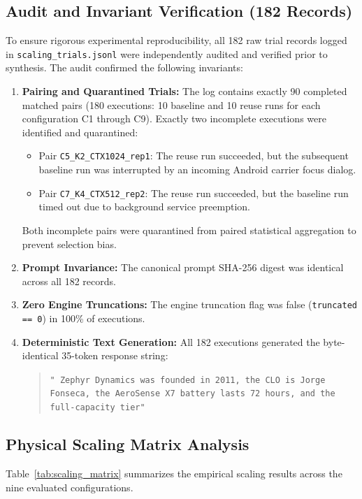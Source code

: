 \subsection{Audit and Invariant Verification (182 Records)}
To ensure rigorous experimental reproducibility, all 182 raw trial records logged in \texttt{scaling\_trials.jsonl} were independently audited and verified prior to synthesis. The audit confirmed the following invariants:
\begin{enumerate}
    \item \textbf{Pairing and Quarantined Trials:} The log contains exactly 90 completed matched pairs (180 executions: 10 baseline and 10 reuse runs for each configuration C1 through C9). Exactly two incomplete executions were identified and quarantined:
    \begin{itemize}
        \item Pair \texttt{C5\_K2\_CTX1024\_rep1}: The reuse run succeeded, but the subsequent baseline run was interrupted by an incoming Android carrier focus dialog.
        \item Pair \texttt{C7\_K4\_CTX512\_rep2}: The reuse run succeeded, but the baseline run timed out due to background service preemption.
    \end{itemize}
    Both incomplete pairs were quarantined from paired statistical aggregation to prevent selection bias.
    \item \textbf{Prompt Invariance:} The canonical prompt SHA-256 digest was identical across all 182 records.
    \item \textbf{Zero Engine Truncations:} The engine truncation flag was false (\texttt{truncated == 0}) in 100\% of executions.
    \item \textbf{Deterministic Text Generation:} All 182 executions generated the byte-identical 35-token response string:
    \begin{quote}
    \small
    \texttt{"~Zephyr Dynamics was founded in 2011, the CLO is Jorge Fonseca, the AeroSense X7 battery lasts 72 hours, and the full-capacity tier"}
    \end{quote}
\end{enumerate}

\subsection{Physical Scaling Matrix Analysis}
Table~\ref{tab:scaling_matrix} summarizes the empirical scaling results across the nine evaluated configurations.

